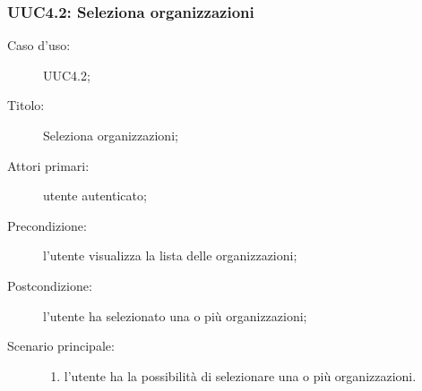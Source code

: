 \documentclass[../../../analisi-dei-requisiti.tex]{subfiles}
\begin{document}
\subsubsection{UUC4.2: Seleziona organizzazioni}%
\label{subs:UUC4.2}
\begin{description}
  \item[Caso d’uso:] UUC4.2;
  \item[Titolo:] Seleziona organizzazioni;
  \item[Attori primari:] utente autenticato;
  \item[Precondizione:] l'utente visualizza la lista delle organizzazioni;
  \item[Postcondizione:] l'utente ha selezionato una o più organizzazioni;
  \item[Scenario principale:]
        \begin{enumerate}
          \item l'utente ha la possibilità di selezionare una o più organizzazioni.
        \end{enumerate}
\end{description}
\end{document}
